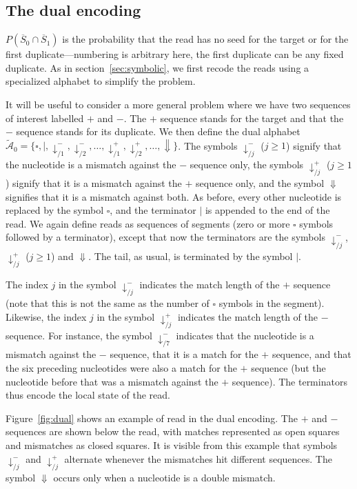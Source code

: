 \documentclass{article}
\begin{document}
\subsection{The dual encoding}
\label{sec:dual}

$P(\overline{S}_0 \cap \overline{S}_1)$ is the probability that the read
has no seed for the target or for the first duplicate---numbering is
arbitrary here, the first duplicate can be any fixed duplicate. As in
section~\ref{sec:symbolic}, we first recode the reads using a specialized
alphabet to simplify the problem.

It will be useful to consider a more general problem where we
have two sequences of interest labelled $+$ and $-$. The $+$ sequence
stands for the target and that the $-$ sequence stands for its duplicate.
We then define the dual alphabet $\tilde{\mathcal{A}}_0 = \{\square, |,
\downarrow_{/1}^-, \downarrow_{/2}^-, \ldots, \downarrow_{/1}^+,
\downarrow_{/2}^+, \ldots, \Downarrow\}$. The symbols $\downarrow_{/j}^-$
($j \geq 1$) signify that the nucleotide is a mismatch against the $-$
sequence only, the symbols $\downarrow_{/j}^+$ ($j \geq 1$) signify that
it is a mismatch against the $+$ sequence only, and the symbol
$\Downarrow$ signifies that it is a mismatch against both. As before,
every other nucleotide is replaced by the symbol $\square$, and the
terminator $|$ is appended to the end of the read. We again define reads
as sequences of segments (zero or more $\square$ symbols followed by a
terminator), except that now the terminators are the symbols
$\downarrow_{/j}^-$, $\downarrow_{/j}^+$ ($j \geq 1$) and $\Downarrow$.
The tail, as usual, is terminated by the symbol $|$.

The index $j$ in the symbol $\downarrow_{/j}^-$ indicates the match length
of the $+$ sequence (note that this is not the same as the number of
$\square$ symbols in the segment). Likewise, the index $j$ in the symbol
$\downarrow_{/j}^+$ indicates the match length of the $-$ sequence. For
instance, the symbol $\downarrow_{/7}^-$ indicates that the nucleotide is
a mismatch against the $-$ sequence, that it is a match for the $+$
sequence, and that the six preceding nucleotides were also a match for the
$+$ sequence (but the nucleotide before that was a mismatch against the
$+$ sequence). The terminators thus encode the local state of the read.

Figure~\ref{fig:dual} shows an example of read in the dual encoding. The
$+$ and $-$ sequences are shown below the read, with matches represented
as open squares and mismatches as closed squares. It is visible from this
example that symbols $\downarrow^-_{/j}$ and $\downarrow^+_{/j}$ alternate
whenever the mismatches hit different sequences. The symbol $\Downarrow$
occurs only when a nucleotide is a double mismatch.
\end{document}
